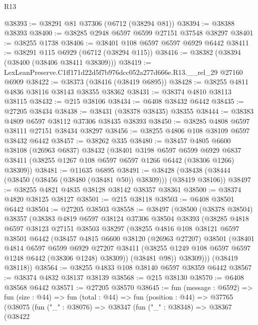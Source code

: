 \begin{lexlean}{R13}
\begin{coremodule}
@38393 := @38291 @81 @37306 (@6712 (@38294 @81))
@38394 := @38388 @38393
@38400 := @38285 @2948 @6597 @6599 @27151 @37548 @38297
@38401 := @38255 @1738
@38406 := @38401 @108 @6597 @6597 @6929 @6442
@38411 := @38291 @115 @6929 (@6712 (@38294 @115))
@38416 := @38382 (@38394 (@38400 (@38406 @38411 @38309)))
@38419 := LexLeanPreserve.C1ff171d22d5f7b976dcc052a277d666e.R13.__rel_29 @27160 @6909
@38422 := @38373 (@38416 (@38419 @6895))
@38428 := @38255 @4811 @4836 @38116 @38143 @38355 @38362
@38431 := @38374 @4810 @38113 @38115
@38432 := @215 @38106
@38434 := @6408 @38432 @6442
@38435 := @27205 @38434
@38438 := @38431 (@38378 @38435) @38355
@38444 := @38383 @4809 @6597 @38112 @37306 @38435 @38393
@38450 := @38285 @4808 @6597 @38111 @27151 @38434 @38297
@38456 := @38255 @4806 @108 @38109 @6597 @38432 @6442
@38457 := @38262 @335
@38480 := @38457
    @4805
    @6600
    @38108
    (@26963 @6837)
    @38432
    (@38401
      @3198
      @6597
      @6599
      @6929
      @6837
      @38411
      (@38255 @1267 @108 @6597 @6597 @1266 @6442 (@38306 @1266) @38309))
@38481 := @11635 @6895
@38491 := @38428 (@38438 (@38444 (@38450 (@38456 (@38480 (@38481 @50)) @38309))) (@38419 @38106))
@38497 := @38255 @4821 @4835 @38128 @38142 @38357 @38361
@38500 := @38374 @4820 @38125 @38127
@38501 := @215 @38118
@38503 := @6408 @38501 @6442
@38504 := @27205 @38503
@38558 := @38497
    (@38500
      (@38378 @38504)
      @38357
      (@38383
        @4819
        @6597
        @38124
        @37306
        @38504
        @38393
        (@38285
          @4818
          @6597
          @38123
          @27151
          @38503
          @38297
          (@38255
            @4816
            @108
            @38121
            @6597
            @38501
            @6442
            (@38457
              @4815
              @6600
              @38120
              (@26963 @27207)
              @38501
              (@38401
                @4814
                @6597
                @6599
                @6929
                @27207
                @38411
                (@38255 @1249 @108 @6597 @6597 @1248 @6442 (@38306 @1248) @38309))
              (@38481 @98))
            @38309)))
      (@38419 @38118))
@38564 := @38255 @4833 @108 @38140 @6597 @38359 @6442
@38567 := @38374 @4832 @38137 @38139
@38568 := @215 @38130
@38570 := @6408 @38568 @6442
@38571 := @27205 @38570
@38645 := fun (message : @6592) =>
  fun (size : @44) =>
  fun (total : @44) =>
  fun (position : @44) =>
  @37765
    (@38075
      (fun ("_" : @38076) =>
      @38347
        (fun ("_" : @38348) =>
        @38367
          (@38422

\end{coremodule}
\end{lexlean}
